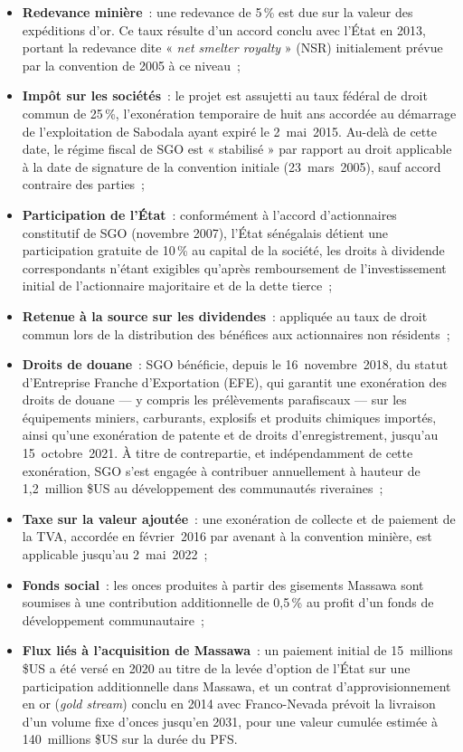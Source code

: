\begin{itemize}
  \item \textbf{Redevance minière}~: une redevance de 5\,\% est due sur la valeur des expéditions d'or. Ce taux résulte d'un accord conclu avec l'État en 2013, portant la redevance dite « \emph{net smelter royalty} » (NSR) initialement prévue par la convention de 2005 à ce niveau~;
  \item \textbf{Impôt sur les sociétés}~: le projet est assujetti au taux fédéral de droit commun de 25\,\%, l'exonération temporaire de huit ans accordée au démarrage de l'exploitation de Sabodala ayant expiré le 2~mai~2015. Au-delà de cette date, le régime fiscal de SGO est « stabilisé » par rapport au droit applicable à la date de signature de la convention initiale (23~mars~2005), sauf accord contraire des parties~;
  \item \textbf{Participation de l'État}~: conformément à l'accord d'actionnaires constitutif de SGO (novembre 2007), l'État sénégalais détient une participation gratuite de 10\,\% au capital de la société, les droits à dividende correspondants n'étant exigibles qu'après remboursement de l'investissement initial de l'actionnaire majoritaire et de la dette tierce~;
  \item \textbf{Retenue à la source sur les dividendes}~: appliquée au taux de droit commun lors de la distribution des bénéfices aux actionnaires non résidents~;
  \item \textbf{Droits de douane}~: SGO bénéficie, depuis le 16~novembre~2018, du statut d'Entreprise Franche d'Exportation (EFE), qui garantit une exonération des droits de douane --- y compris les prélèvements parafiscaux --- sur les équipements miniers, carburants, explosifs et produits chimiques importés, ainsi qu'une exonération de patente et de droits d'enregistrement, jusqu'au 15~octobre~2021. À titre de contrepartie, et indépendamment de cette exonération, SGO s'est engagée à contribuer annuellement à hauteur de 1,2~million \$US au développement des communautés riveraines~;
  \item \textbf{Taxe sur la valeur ajoutée}~: une exonération de collecte et de paiement de la TVA, accordée en février~2016 par avenant à la convention minière, est applicable jusqu'au 2~mai~2022~;
  \item \textbf{Fonds social}~: les onces produites à partir des gisements Massawa sont soumises à une contribution additionnelle de 0,5\,\% au profit d'un fonds de développement communautaire~;
  \item \textbf{Flux liés à l'acquisition de Massawa}~: un paiement initial de 15~millions \$US a été versé en 2020 au titre de la levée d'option de l'État sur une participation additionnelle dans Massawa, et un contrat d'approvisionnement en or (\emph{gold stream}) conclu en 2014 avec Franco-Nevada prévoit la livraison d'un volume fixe d'onces jusqu'en 2031, pour une valeur cumulée estimée à 140~millions \$US sur la durée du PFS.
\end{itemize}

